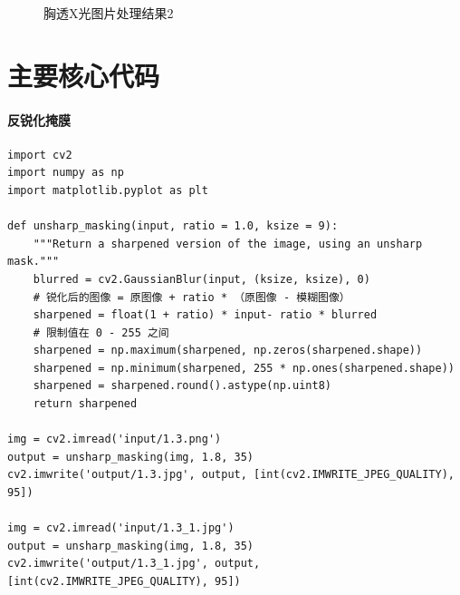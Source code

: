 \documentclass[11pt]{ctexart}
\begin{document}
\begin{figure}[htbp]
{\begin{minipage}[t]{0.4\linewidth}
    \end{minipage}
    }
    \centering
    \caption{胸透X光图片处理结果2}\label{fig:digit}
  \end{figure}

\section{主要核心代码}

\paragraph{反锐化掩膜}

\lstset{language=python}
\begin{lstlisting}
import cv2
import numpy as np
import matplotlib.pyplot as plt

def unsharp_masking(input, ratio = 1.0, ksize = 9):
	"""Return a sharpened version of the image, using an unsharp mask."""
	blurred = cv2.GaussianBlur(input, (ksize, ksize), 0)
	# 锐化后的图像 = 原图像 + ratio * （原图像 - 模糊图像）
	sharpened = float(1 + ratio) * input- ratio * blurred
	# 限制值在 0 - 255 之间
	sharpened = np.maximum(sharpened, np.zeros(sharpened.shape))
	sharpened = np.minimum(sharpened, 255 * np.ones(sharpened.shape))
	sharpened = sharpened.round().astype(np.uint8)
	return sharpened

img = cv2.imread('input/1.3.png')
output = unsharp_masking(img, 1.8, 35)
cv2.imwrite('output/1.3.jpg', output, [int(cv2.IMWRITE_JPEG_QUALITY), 95])

img = cv2.imread('input/1.3_1.jpg')
output = unsharp_masking(img, 1.8, 35)
cv2.imwrite('output/1.3_1.jpg', output, [int(cv2.IMWRITE_JPEG_QUALITY), 95])

\end{lstlisting}
\end{document}
